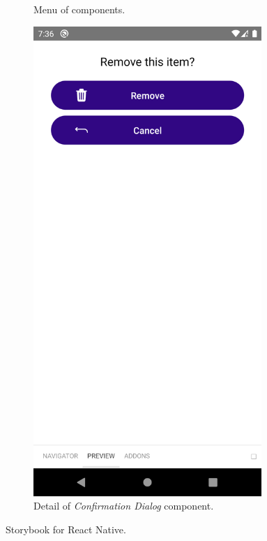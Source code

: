 \documentclass[
  digital, %
  table,   %
  oneside, %
  lof,     %
  lot,     %
]{fithesis3}
\newcommand\half{0.45}
\newcommand\subfigsize{0.95}
\begin{document}
\begin{figure}
\begin{subfigure}[t]{\half\textwidth}
      \caption{Menu of components.}
      \label{fig:storybook_rn_menu}
    \end{subfigure}
    \begin{subfigure}[t]{\half\textwidth}
      \centering
      \includegraphics[width=\subfigsize\textwidth]{figures/other/storybook_rn_confirm_delete_component}
      \caption{Detail of \textit{Confirmation Dialog} component.}
      \label{fig:storybook_rn_confirm_delete_component}
    \end{subfigure}
    \caption{Storybook for React Native.}
    \label{fig:storybook_rn}
\end{figure}
\end{document}
